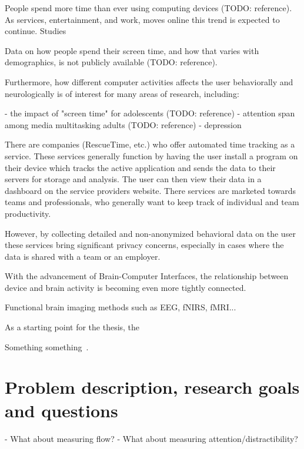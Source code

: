 \documentclass[a4paper]{article}   %
\begin{document}
\begin{markdown}
People spend more time than ever using computing devices (TODO: reference). As services, entertainment, and work, moves online this trend is expected to continue. Studies

Data on how people spend their screen time, and how that varies with demographics, is not publicly available (TODO: reference).

Furthermore, how different computer activities affects the user behaviorally and neurologically is of interest for many areas of research, including:

 - the impact of "screen time" for adolescents (TODO: reference)
 - attention span among media multitasking adults (TODO: reference)
 - depression

There are companies (RescueTime, etc.) who offer automated time tracking as a service. These services generally function by having the user install a program on their device which tracks the active application and sends the data to their servers for storage and analysis. The user can then view their data in a dashboard on the service providers website. There services are marketed towards teams and professionals, who generally want to keep track of individual and team productivity.

However, by collecting detailed and non-anonymized behavioral data on the user these services bring significant privacy concerns, especially in cases where the data is shared with a team or an employer.

With the advancement of Brain-Computer Interfaces, the relationship between device and brain activity is becoming even more tightly connected.

Functional brain imaging methods such as EEG, fNIRS, fMRI...

As a starting point for the thesis, the
\end{markdown}

Something something~\cite{fucci_replication_2019}.

\section{Problem description, research goals and questions}
\begin{markdown}

 - What about measuring flow?
 - What about measuring attention/distractibility?

\end{markdown}
\end{document}
